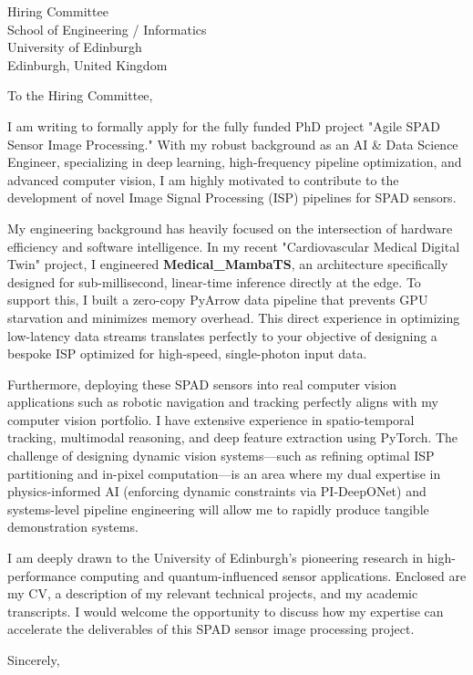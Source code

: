 \documentclass[11pt,a4paper]{letter}
\begin{document}
\begin{letter}{
    Hiring Committee \\
    School of Engineering / Informatics \\
    University of Edinburgh \\
    Edinburgh, United Kingdom
}

\opening{To the Hiring Committee,}

I am writing to formally apply for the fully funded PhD project "Agile SPAD Sensor Image Processing." With my robust background as an AI \& Data Science Engineer, specializing in deep learning, high-frequency pipeline optimization, and advanced computer vision, I am highly motivated to contribute to the development of novel Image Signal Processing (ISP) pipelines for SPAD sensors. 

My engineering background has heavily focused on the intersection of hardware efficiency and software intelligence. In my recent "Cardiovascular Medical Digital Twin" project, I engineered \textbf{Medical\_MambaTS}, an architecture specifically designed for sub-millisecond, linear-time inference directly at the edge. To support this, I built a zero-copy PyArrow data pipeline that prevents GPU starvation and minimizes memory overhead. This direct experience in optimizing low-latency data streams translates perfectly to your objective of designing a bespoke ISP optimized for high-speed, single-photon input data.

Furthermore, deploying these SPAD sensors into real computer vision applications such as robotic navigation and tracking perfectly aligns with my computer vision portfolio. I have extensive experience in spatio-temporal tracking, multimodal reasoning, and deep feature extraction using PyTorch. The challenge of designing dynamic vision systems—such as refining optimal ISP partitioning and in-pixel computation—is an area where my dual expertise in physics-informed AI (enforcing dynamic constraints via PI-DeepONet) and systems-level pipeline engineering will allow me to rapidly produce tangible demonstration systems.

I am deeply drawn to the University of Edinburgh's pioneering research in high-performance computing and quantum-influenced sensor applications. Enclosed are my CV, a description of my relevant technical projects, and my academic transcripts. I would welcome the opportunity to discuss how my expertise can accelerate the deliverables of this SPAD sensor image processing project.

\closing{Sincerely,}

\end{letter}
\end{document}
